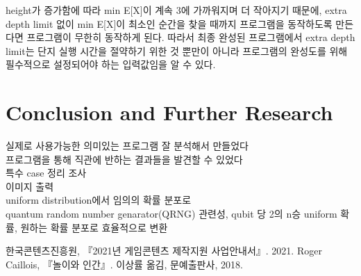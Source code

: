 \documentclass[11pt]{article}
\begin{document}
height가 증가함에 따라 min E[X]이 계속 3에 가까워지며 더 작아지기 때문에, extra depth limit 없이 min E[X]이 최소인 순간을 찾을 때까지 프로그램을 동작하도록 만든다면 프로그램이 무한히 동작하게 된다. 따라서 최종 완성된 프로그램에서 extra depth limit는 단지 실행 시간을 절약하기 위한 것 뿐만이 아니라 프로그램의 완성도를 위해 필수적으로 설정되어야 하는 입력값임을 알 수 있다.

\section{Conclusion and Further Research}


실제로 사용가능한 의미있는 프로그램 잘 분석해서 만들었다\\
프로그램을 통해 직관에 반하는 결과들을 발견할 수 있었다\\
특수 case 정리 조사\\
이미지 출력\\
uniform distribution에서 임의의 확률 분포로\\
quantum random number genarator(QRNG) 관련성, qubit 당 2의 n승 uniform 확률, 원하는 확률 분포로 효율적으로 변환\\

\begin{thebibliography}{99}
한국콘텐츠진흥원, 『2021년 게임콘텐츠 제작지원 사업안내서』. 2021.
Roger Caillois, 『놀이와 인간』. 이상률 옮김, 문예출판사, 2018.

\end{thebibliography}
\end{document}
